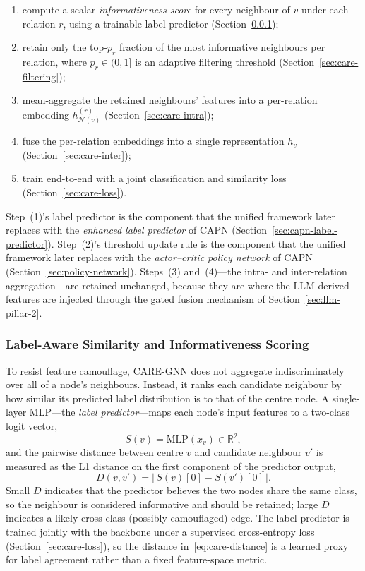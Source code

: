 \begin{enumerate}
    \item compute a scalar \emph{informativeness score} for every neighbour of $v$ under each relation $r$, using a trainable label predictor (Section~\ref{sec:care-label-predictor});
    \item retain only the top-$p_r$ fraction of the most informative neighbours per relation, where $p_r \in (0, 1]$ is an adaptive filtering threshold (Section~\ref{sec:care-filtering});
    \item mean-aggregate the retained neighbours' features into a per-relation embedding $h^{(r)}_{\mathcal{N}(v)}$ (Section~\ref{sec:care-intra});
    \item fuse the per-relation embeddings into a single representation $h_v$ (Section~\ref{sec:care-inter});
    \item train end-to-end with a joint classification and similarity loss (Section~\ref{sec:care-loss}).
\end{enumerate}

Step~(1)'s label predictor is the component that the unified framework later replaces with the \emph{enhanced label predictor} of CAPN (Section~\ref{sec:capn-label-predictor}). Step~(2)'s threshold update rule is the component that the unified framework later replaces with the \emph{actor--critic policy network} of CAPN (Section~\ref{sec:policy-network}). Steps~(3) and~(4)---the intra- and inter-relation aggregation---are retained unchanged, because they are where the LLM-derived features are injected through the gated fusion mechanism of Section~\ref{sec:llm-pillar-2}.

\subsubsection{Label-Aware Similarity and Informativeness Scoring}
\label{sec:care-label-predictor}

To resist feature camouflage, CARE-GNN does not aggregate indiscriminately over all of a node's neighbours. Instead, it ranks each candidate neighbour by how similar its predicted label distribution is to that of the centre node. A single-layer MLP---the \emph{label predictor}---maps each node's input features to a two-class logit vector,
\begin{equation}
S(v) = \mathrm{MLP}(x_v) \in \mathbb{R}^2,
\end{equation}
and the pairwise distance between centre $v$ and candidate neighbour $v'$ is measured as the L1 distance on the first component of the predictor output,
\begin{equation}
D(v, v') = \bigl|\, S(v)[0] - S(v')[0] \,\bigr|.
\label{eq:care-distance}
\end{equation}
Small $D$ indicates that the predictor believes the two nodes share the same class, so the neighbour is considered informative and should be retained; large $D$ indicates a likely cross-class (possibly camouflaged) edge. The label predictor is trained jointly with the backbone under a supervised cross-entropy loss (Section~\ref{sec:care-loss}), so the distance in~\eqref{eq:care-distance} is a learned proxy for label agreement rather than a fixed feature-space metric.

